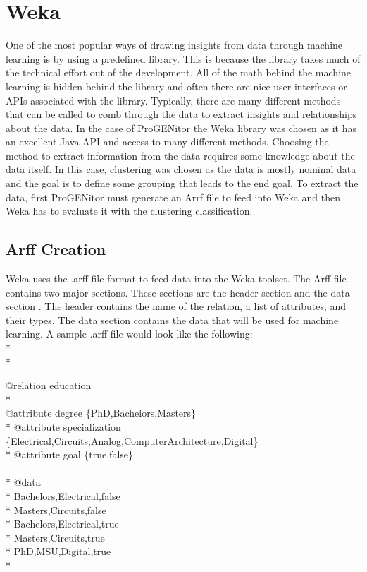 \section{Weka}
\label{sect:weka}
One of the most popular ways of drawing insights from data through machine
learning is by using a predefined library.  This is because the library takes
much of the technical effort out of the development.  All of the math behind the
machine learning is hidden behind the library and often there are nice user
interfaces or APIs associated with the library.  Typically, there are many
different methods that can be called to comb through the data to extract
insights and relationships about the data.  In the case of ProGENitor the Weka
library was chosen as it has an excellent Java API and access to many different
methods.  Choosing the method to extract information from the data requires some
knowledge about the data itself.  In this case, clustering was chosen as the
data is mostly nominal data and the goal is to define some grouping that leads
to the end goal.  To extract the data, first ProGENitor must generate an
Arrf file to feed into Weka and then Weka has to evaluate it with the clustering
classification.

\subsection{Arff Creation}
Weka uses the .arff file format to feed data into the Weka toolset.  The Arff
file contains two major sections.  These sections are the header section and the
data section \cite{arff}.  The header contains the name of the relation, a list
of attributes, and their types.  The data section contains the data that will
be used for machine learning.  A sample .arff file would look like the
following:\\*
\\*
\begin{tt}
\begin{footnotesize}
@relation education\\*
\\
@attribute degree \{PhD,Bachelors,Masters\}\\*
@attribute specialization
\{Electrical,Circuits,Analog,Computer\newline \indent Architecture,Digital\}\\*
@attribute goal \{true,false\}\\ \\* @data\\*
Bachelors,Electrical,false\\*
Masters,Circuits,false\\*
Bachelors,Electrical,true\\*
Masters,Circuits,true\\*
PhD,MSU,Digital,true\\*
\end{footnotesize}
\end{tt}

